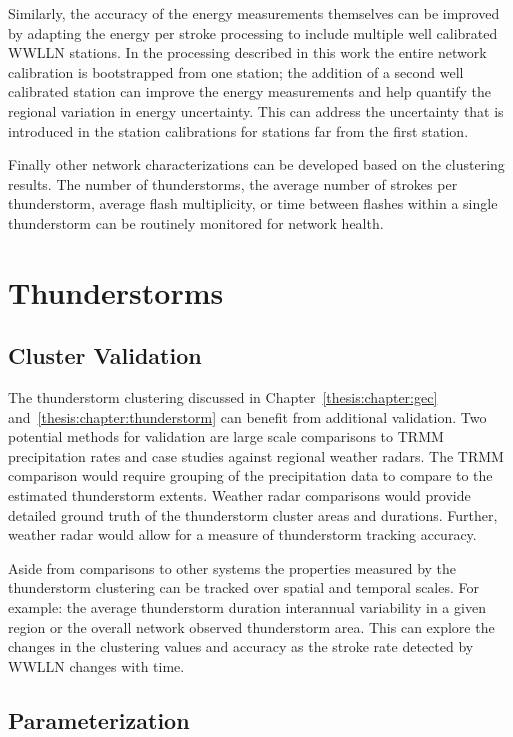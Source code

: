 Similarly, the accuracy of the energy measurements themselves can be improved by adapting the energy per stroke processing to include multiple well calibrated WWLLN stations.
In the processing described in this work the entire network calibration is bootstrapped from one station; the addition of a second well calibrated station can improve the energy measurements and help quantify the regional variation in energy uncertainty.
This can address the uncertainty that is introduced in the station calibrations for stations far from the first station.

Finally other network characterizations can be developed based on the clustering results.
The number of thunderstorms, the average number of strokes per thunderstorm, average flash multiplicity, or time between flashes within a single thunderstorm can be routinely monitored for network health.

\section{Thunderstorms}

\subsection{Cluster Validation}

The thunderstorm clustering discussed in Chapter~\ref{thesis:chapter:gec} and~\ref{thesis:chapter:thunderstorm} can benefit from additional validation.
Two potential methods for validation are large scale comparisons to TRMM precipitation rates and case studies against regional weather radars.
The TRMM comparison would require grouping of the precipitation data to compare to the estimated thunderstorm extents.
Weather radar comparisons would provide detailed ground truth of the thunderstorm cluster areas and durations.
Further, weather radar would allow for a measure of thunderstorm tracking accuracy.

Aside from comparisons to other systems the properties measured by the thunderstorm clustering can be tracked over spatial and temporal scales.
For example: the average thunderstorm duration interannual variability in a given region or the overall network observed thunderstorm area.
This can explore the changes in the clustering values and accuracy as the stroke rate detected by WWLLN changes with time.

\subsection{Parameterization}

